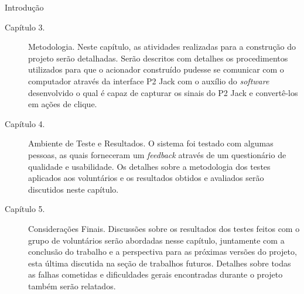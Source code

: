 \begin{chapter}{Introdução}
\begin{description}
	\item[Capítulo 3.] Metodologia. 
	Neste capítulo, as atividades realizadas para a construção do projeto serão
	detalhadas. Serão descritos com detalhes os procedimentos utilizados
	para que o acionador construído pudesse se comunicar com o computador
	através da interface P2 Jack com o auxílio do \textit{software} desenvolvido
	o qual é capaz de capturar os sinais do P2 Jack e convertê-los em ações de
	clique.
	
	\item[Capítulo 4.] Ambiente de Teste e Resultados. 
	O sistema foi testado com algumas pessoas, as quais forneceram um
	\textit{feedback} através de um questionário de qualidade e usabilidade.
	Os detalhes sobre a metodologia dos testes aplicados aos voluntários e os
	resultados obtidos e avaliados serão discutidos neste capítulo.

	\item[Capítulo 5.] Considerações Finais. 
	Discussões sobre os resultados dos testes feitos com o grupo de voluntários
	serão abordadas nesse capítulo, juntamente com a conclusão do trabalho e a
	perspectiva para as próximas versões do projeto, esta última discutida na
	seção de trabalhos futuros. Detalhes sobre todas as falhas cometidas e
	dificuldades gerais encontradas durante o projeto também serão relatados. 
\end{description}

\end{chapter}
